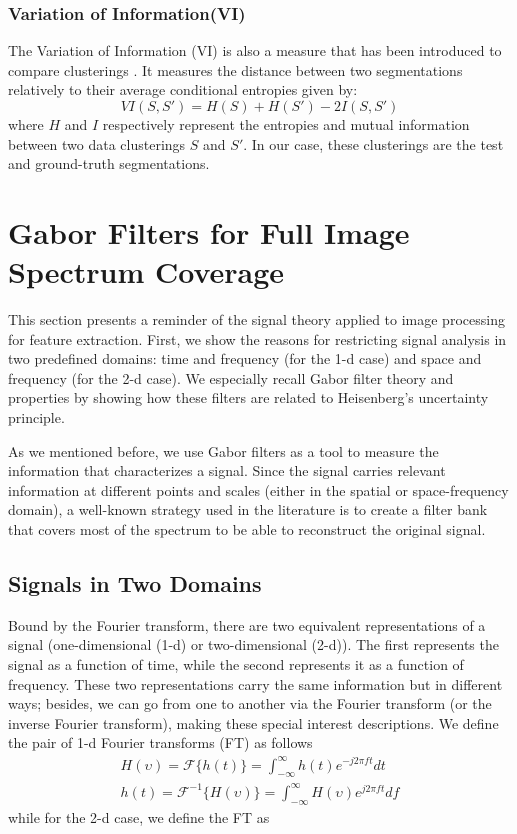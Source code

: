 \documentclass[journal]{IEEEtran}
\begin{document}
\subsubsection{Variation of Information(VI)}
The Variation of Information (VI) is also a measure that has been introduced to compare clusterings \cite{Meila:LTKM:2003}. It measures the distance between two segmentations relatively to their average conditional entropies given by:
\begin{equation}
	VI(S, S') = H(S) + H(S') - 2I(S, S')
\end{equation}
where $H$ and $I$ respectively represent the entropies and mutual information between two data clusterings $S$ and $S'$. In our case, these clusterings are the test and ground-truth segmentations.


\section{Gabor Filters for Full Image Spectrum Coverage}

This section presents a reminder of the signal theory applied to image processing for feature extraction. First, we show the reasons for restricting signal analysis in two predefined domains: time and frequency (for the 1-d case) and space and frequency (for the 2-d case). We especially recall Gabor filter theory and properties by showing how these filters are related to Heisenberg's uncertainty principle.

As we mentioned before, we use Gabor filters as a tool to measure the information that characterizes a signal. Since the signal carries relevant information at different points and scales (either in the spatial or space-frequency domain), a well-known strategy used in the literature is to create a filter bank that covers most of the spectrum to be able to reconstruct the original signal.

\subsection{Signals in Two Domains}
Bound by the Fourier transform, there are two equivalent representations of a signal (one-dimensional (1-d) or two-dimensional (2-d)). The first represents the signal as a function of time, while the second represents it as a function of frequency. These two representations carry the same information but in different ways; besides, we can go from one to another via the Fourier transform (or the inverse Fourier transform), making these special interest descriptions. We define the pair of 1-d Fourier transforms (FT) as follows
\begin{equation}\label{eq:fourier_transforms_1d}
    \begin{gathered}
        H(\upsilon) = \mathcal{F}\{h(t)\} = \int_{-\infty}^{\infty} h(t) e^{-j2\pi f t} dt \\
        h(t) = \mathcal{F}^{-1}\{H(\upsilon)\} = \int_{-\infty}^{\infty} H(\upsilon) e^{j2\pi f t} df 
    \end{gathered}
\end{equation}
while for the 2-d case, we define the FT as
\end{document}
